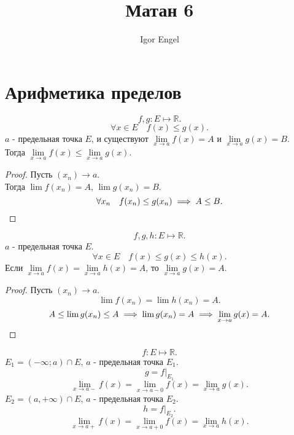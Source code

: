 \documentclass[11pt, oneside]{article}   	%
\title{Матан 6}
\author{Igor Engel}
\date{}
\begin{document}
\maketitle
\section{Арифметика пределов}
    \begin{theorem}
        \[ f, g: E \mapsto \mathbb{R} .\]
        \[ \forall{x\in E}\quad f(x) \le g(x)  .\]
        $a$ - предельная точка $E$, и существуют $\lim\limits_{x \to a} f(x) = A$ и $\lim\limits_{x \to a} g(x) = B$.\\
        Тогда $\lim\limits_{x \to a} f(x) \le \lim\limits_{x \to a} g(x)$.
        \begin{proof}
            Пусть $(x_n) \to a$.\\
            Тогда $\lim f(x_n) = A$, $\lim g\left( x_n \right) = B$.\\
            \[ \forall{x_n}\quad f(x_n) \le g(x_n) \implies A\le B .\qedhere\] 
        \end{proof}
    \end{theorem}
    \begin{theorem}
        \[ f,g,h: E \mapsto \mathbb{R} .\]
        $a$ - предельная точка $E$.\\
        \[ \forall{x\in E}\quad f(x) \le g(x) \le h(x)   .\]
        Если $\lim\limits_{x \to a} f(x) = \lim\limits_{x \to a} h(x) = A$, то $\lim\limits_{x \to a} g(x) = A$.
        \begin{proof}
            Пусть $(x_n) \to a$.\\
            \[ \lim f(x_n) = \lim h(x_n) = A .\]
            \[ A \le \lim g(x_n) \le A \implies \lim g(x_n) = A \implies \lim\limits_{x \to a} g(x) = A .\qedhere\] 
        \end{proof}
    \end{theorem}
    \begin{definition}
        \[ f: E \mapsto \mathbb{R} .\] 
        $E_1 = \left( -\infty; a \right)\cap E$, $a$ - предельная точка $ E_1$.\\
        \[ g = \left.f\right|_{E_1}\]
        \[ \lim\limits_{x \to a-} f(x) = \lim\limits_{x \to a-0} f(x) = \lim\limits_{x \to a} g(x)  .\] 
        $E_2 = \left( a, +\infty \right)\cap E$, $a$ - предельная точка $ E_2$.\\
        \[ h = \left.f\right|_{E_2} .\]
            \[ \lim\limits_{x \to a+} f(x) = \lim\limits_{x \to a+0} f(x) = \lim\limits_{x \to a} h(x) .\] 
    \end{definition}
\end{document}

